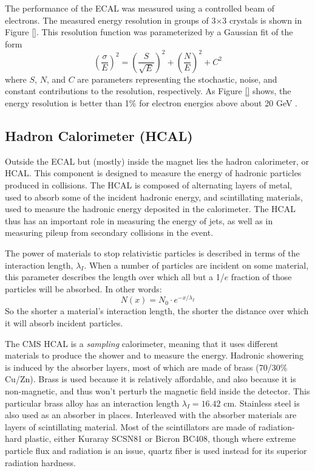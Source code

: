 The performance of the ECAL was measured using a controlled beam of
electrons. The measured energy resolution in groups of 3$\times$3
crystals is shown in Figure \ref{}.
This resolution function was parameterized by a Gaussian fit of the form
\begin{equation}
\left( \frac{\sigma}{E} \right)^2 =
\left( \frac{S}{\sqrt{E}} \right)^2 +
\left( \frac{N}{E} \right)^2 + C^2
\end{equation}
where $S$, $N$, and $C$ are parameters representing the stochastic,
noise, and constant contributions to the resolution, respectively. As
Figure \ref{} shows, the energy resolution is better
than 1\% for electron energies above about 20 GeV \cite{tdr}.


\subsection{Hadron Calorimeter (HCAL)}
\label{ssec:cms:components:hcal}

Outside the ECAL but (mostly) inside the magnet lies the hadron
calorimeter, or HCAL. This component is designed to measure the energy
of hadronic particles produced in collisions. The HCAL is composed of
alternating layers of metal, used to absorb some of the incident
hadronic energy, and scintillating materials, used to measure the
hadronic energy deposited in the calorimeter. The HCAL thus has an
important role in measuring the energy of jets, as well as in
measuring pileup from secondary collisions in the event.

The power of materials to stop relativistic particles is described in
terms of the interaction length, $\lambda_I$. When a number of
particles are incident on some material, this parameter describes
the length over which all but a 1/$e$ fraction of those particles will
be absorbed. In other words:
\begin{equation}
\label{eq:cms:hcal:intlength}
N(x) = N_0 \cdot e^{-x/\lambda_I}
\end{equation}
So the shorter a material's interaction length, the shorter the
distance over which it will absorb incident particles.

The CMS HCAL is a \emph{sampling} calorimeter, meaning that it uses
different materials to produce the shower and to measure the
energy. Hadronic showering is induced by the absorber layers, most of
which are made of brass (70/30\% Cu/Zn). Brass
is used because it is relatively affordable, and also because it is
non-magnetic, and thus won't perturb the magnetic field inside the
detector. This particular brass alloy has an interaction length
$\lambda_I = 16.42$ cm. Stainless steel is also used as an absorber in places.
Interleaved with the absorber materials are layers of
scintillating material. Most of the scintillators are made of
radiation-hard plastic, either Kuraray SCSN81 or Bicron BC408, though
where extreme particle flux and radiation is an issue, quartz fiber is
used instead for its superior radiation hardness.

